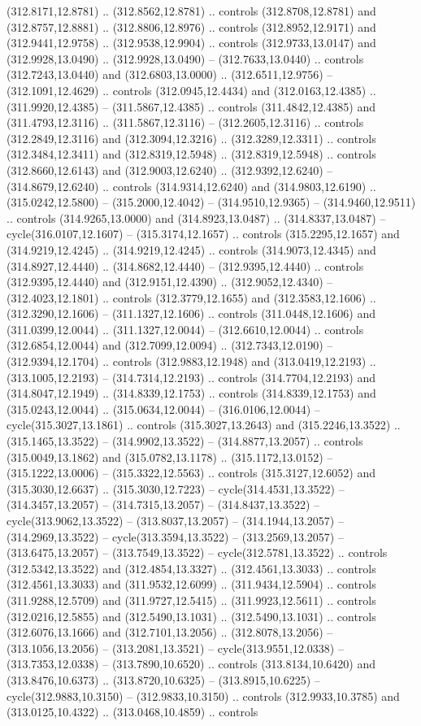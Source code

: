 (312.8171,12.8781) .. (312.8562,12.8781) .. controls (312.8708,12.8781) and (312.8757,12.8881) .. (312.8806,12.8976) .. controls (312.8952,12.9171) and (312.9441,12.9758) .. (312.9538,12.9904) .. controls (312.9733,13.0147) and (312.9928,13.0490) .. (312.9928,13.0490) -- (312.7633,13.0440) .. controls (312.7243,13.0440) and (312.6803,13.0000) .. (312.6511,12.9756) -- (312.1091,12.4629) .. controls (312.0945,12.4434) and (312.0163,12.4385) .. (311.9920,12.4385) -- (311.5867,12.4385) .. controls (311.4842,12.4385) and (311.4793,12.3116) .. (311.5867,12.3116) -- (312.2605,12.3116) .. controls (312.2849,12.3116) and (312.3094,12.3216) .. (312.3289,12.3311) .. controls (312.3484,12.3411) and (312.8319,12.5948) .. (312.8319,12.5948) .. controls (312.8660,12.6143) and (312.9003,12.6240) .. (312.9392,12.6240) -- (314.8679,12.6240) .. controls (314.9314,12.6240) and (314.9803,12.6190) .. (315.0242,12.5800) -- (315.2000,12.4042) -- (314.9510,12.9365) -- (314.9460,12.9511) .. controls (314.9265,13.0000) and (314.8923,13.0487) .. (314.8337,13.0487) -- cycle(316.0107,12.1607) -- (315.3174,12.1657) .. controls (315.2295,12.1657) and (314.9219,12.4245) .. (314.9219,12.4245) .. controls (314.9073,12.4345) and (314.8927,12.4440) .. (314.8682,12.4440) -- (312.9395,12.4440) .. controls (312.9395,12.4440) and (312.9151,12.4390) .. (312.9052,12.4340) -- (312.4023,12.1801) .. controls (312.3779,12.1655) and (312.3583,12.1606) .. (312.3290,12.1606) -- (311.1327,12.1606) .. controls (311.0448,12.1606) and (311.0399,12.0044) .. (311.1327,12.0044) -- (312.6610,12.0044) .. controls (312.6854,12.0044) and (312.7099,12.0094) .. (312.7343,12.0190) -- (312.9394,12.1704) .. controls (312.9883,12.1948) and (313.0419,12.2193) .. (313.1005,12.2193) -- (314.7314,12.2193) .. controls (314.7704,12.2193) and (314.8047,12.1949) .. (314.8339,12.1753) .. controls (314.8339,12.1753) and (315.0243,12.0044) .. (315.0634,12.0044) -- (316.0106,12.0044) -- cycle(315.3027,13.1861) .. controls (315.3027,13.2643) and (315.2246,13.3522) .. (315.1465,13.3522) -- (314.9902,13.3522) -- (314.8877,13.2057) .. controls (315.0049,13.1862) and (315.0782,13.1178) .. (315.1172,13.0152) -- (315.1222,13.0006) -- (315.3322,12.5563) .. controls (315.3127,12.6052) and (315.3030,12.6637) .. (315.3030,12.7223) -- cycle(314.4531,13.3522) -- (314.3457,13.2057) -- (314.7315,13.2057) -- (314.8437,13.3522) -- cycle(313.9062,13.3522) -- (313.8037,13.2057) -- (314.1944,13.2057) -- (314.2969,13.3522) -- cycle(313.3594,13.3522) -- (313.2569,13.2057) -- (313.6475,13.2057) -- (313.7549,13.3522) -- cycle(312.5781,13.3522) .. controls (312.5342,13.3522) and (312.4854,13.3327) .. (312.4561,13.3033) .. controls (312.4561,13.3033) and (311.9532,12.6099) .. (311.9434,12.5904) .. controls (311.9288,12.5709) and (311.9727,12.5415) .. (311.9923,12.5611) .. controls (312.0216,12.5855) and (312.5490,13.1031) .. (312.5490,13.1031) .. controls (312.6076,13.1666) and (312.7101,13.2056) .. (312.8078,13.2056) -- (313.1056,13.2056) -- (313.2081,13.3521) -- cycle(313.9551,12.0338) -- (313.7353,12.0338) -- (313.7890,10.6520) .. controls (313.8134,10.6420) and (313.8476,10.6373) .. (313.8720,10.6325) -- (313.8915,10.6225) -- cycle(312.9883,10.3150) -- (312.9833,10.3150) .. controls (312.9933,10.3785) and (313.0125,10.4322) .. (313.0468,10.4859) .. controls 